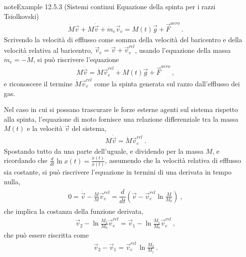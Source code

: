 \documentclass[letterpaper,10pt,italian]{jupyterBook}
\begin{document}
\begin{sphinxadmonition}{note}{Example 12.5.3 (Sistemi continui \sphinxhyphen{} Equazione della spinta per i razzi \sphinxhyphen{} Tsiolkovski)}
\begin{equation*}
\begin{split}\dot{M} \vec{v} + M \dot{\vec{v}} + \dot{m}_e \vec{v}_e = M(t) \vec{g} + \vec{F}^{aero} \ .\end{split}
\end{equation*}
\sphinxAtStartPar
Scrivendo la velocità di efflusso come somma della velocità del baricentro e della velocità relativa al baricentro, \(\vec{v}_e = \vec{v} + \vec{v}_e^{rel}\), usando l’equazione della massa \(\dot{m}_e = - \dot{M}\), si può riscrivere l’equazione
\begin{equation*}
\begin{split}M \dot{\vec{v}} = \dot{M} \vec{v}_e^{rel} + M(t) \vec{g} + \vec{F}^{aero} \ ,\end{split}
\end{equation*}
\sphinxAtStartPar
e riconoscere il termine \(\dot{M} \vec{v}_e^{rel}\) come la spinta generata sul razzo dall’efflusso dei gas.

\sphinxAtStartPar
Nel caso in cui si possano trascurare le forze esterne agenti sul sistema rispetto alla spinta, l’equazione di moto fornisce una relazione differenziale tra la massa \(M(t)\) e la velocità \(\vec{v}\) del sistema,
\begin{equation*}
\begin{split}M \dot{\vec{v}} = \dot{M} \vec{v}_e^{rel} \ .\end{split}
\end{equation*}
\sphinxAtStartPar
Spostando tutto da una parte dell’uguale, e dividendo per la massa \(M\), e ricordando che \(\frac{d}{dt} \ln x(t) = \frac{\dot{x}(t)}{x(t)}\), assumendo che la velocità relativa di efflusso sia costante, si può riscrivere l’equazione in termini di una derivata in tempo nulla,
\begin{equation*}
\begin{split}\begin{aligned}
  0 = \dot{\vec{v}} - \frac{\dot{M}}{M} \vec{v}_e^{rel} = \dfrac{d}{dt} \left( \vec{v} - \vec{v}^{rel}_e \ln \frac{M}{M_0} \right) \ ,
\end{aligned}\end{split}
\end{equation*}
\sphinxAtStartPar
che implica la costanza della funzione derivata,
\begin{equation*}
\begin{split}\vec{v}_2 - \ln \frac{M_2}{M_0} \vec{v}^{rel}_e = \vec{v}_1 - \ln \frac{M_1}{M_0} \vec{v}^{rel}_e \ ,\end{split}
\end{equation*}
\sphinxAtStartPar
che può essere riscritta come
\begin{equation*}
\begin{split}\vec{v}_2 - \vec{v}_1 =  \vec{v}^{rel}_e \, \ln \frac{M_2}{M_1}\ .\end{split}
\end{equation*}\end{sphinxadmonition}
\end{document}

